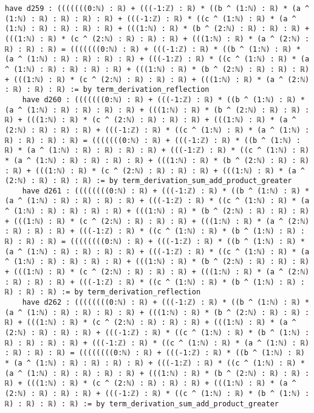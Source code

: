 \documentclass{article}
\begin{document}
\begin{tcolorbox}[colback=white!10, width=\linewidth]
\begin{lstlisting}[language=Lean4]
    have d259 : (((((((0:ℕ) : ℝ) + (((-1:ℤ) : ℝ) * ((b ^ (1:ℕ) : ℝ) * (a ^ (1:ℕ) : ℝ) : ℝ) : ℝ) : ℝ) + (((-1:ℤ) : ℝ) * ((c ^ (1:ℕ) : ℝ) * (a ^ (1:ℕ) : ℝ) : ℝ) : ℝ) : ℝ) + (((1:ℕ) : ℝ) * (b ^ (2:ℕ) : ℝ) : ℝ) : ℝ) + (((1:ℕ) : ℝ) * (c ^ (2:ℕ) : ℝ) : ℝ) : ℝ) + (((1:ℕ) : ℝ) * (a ^ (2:ℕ) : ℝ) : ℝ) : ℝ) = (((((((0:ℕ) : ℝ) + (((-1:ℤ) : ℝ) * ((b ^ (1:ℕ) : ℝ) * (a ^ (1:ℕ) : ℝ) : ℝ) : ℝ) : ℝ) + (((-1:ℤ) : ℝ) * ((c ^ (1:ℕ) : ℝ) * (a ^ (1:ℕ) : ℝ) : ℝ) : ℝ) : ℝ) + (((1:ℕ) : ℝ) * (b ^ (2:ℕ) : ℝ) : ℝ) : ℝ) + (((1:ℕ) : ℝ) * (c ^ (2:ℕ) : ℝ) : ℝ) : ℝ) + (((1:ℕ) : ℝ) * (a ^ (2:ℕ) : ℝ) : ℝ) : ℝ) := by term_derivation_reflection
    have d260 : (((((((0:ℕ) : ℝ) + (((-1:ℤ) : ℝ) * ((b ^ (1:ℕ) : ℝ) * (a ^ (1:ℕ) : ℝ) : ℝ) : ℝ) : ℝ) + (((1:ℕ) : ℝ) * (b ^ (2:ℕ) : ℝ) : ℝ) : ℝ) + (((1:ℕ) : ℝ) * (c ^ (2:ℕ) : ℝ) : ℝ) : ℝ) + (((1:ℕ) : ℝ) * (a ^ (2:ℕ) : ℝ) : ℝ) : ℝ) + (((-1:ℤ) : ℝ) * ((c ^ (1:ℕ) : ℝ) * (a ^ (1:ℕ) : ℝ) : ℝ) : ℝ) : ℝ) = (((((((0:ℕ) : ℝ) + (((-1:ℤ) : ℝ) * ((b ^ (1:ℕ) : ℝ) * (a ^ (1:ℕ) : ℝ) : ℝ) : ℝ) : ℝ) + (((-1:ℤ) : ℝ) * ((c ^ (1:ℕ) : ℝ) * (a ^ (1:ℕ) : ℝ) : ℝ) : ℝ) : ℝ) + (((1:ℕ) : ℝ) * (b ^ (2:ℕ) : ℝ) : ℝ) : ℝ) + (((1:ℕ) : ℝ) * (c ^ (2:ℕ) : ℝ) : ℝ) : ℝ) + (((1:ℕ) : ℝ) * (a ^ (2:ℕ) : ℝ) : ℝ) : ℝ) := by term_derivation_sum_add_product_greater
    have d261 : ((((((((0:ℕ) : ℝ) + (((-1:ℤ) : ℝ) * ((b ^ (1:ℕ) : ℝ) * (a ^ (1:ℕ) : ℝ) : ℝ) : ℝ) : ℝ) + (((-1:ℤ) : ℝ) * ((c ^ (1:ℕ) : ℝ) * (a ^ (1:ℕ) : ℝ) : ℝ) : ℝ) : ℝ) + (((1:ℕ) : ℝ) * (b ^ (2:ℕ) : ℝ) : ℝ) : ℝ) + (((1:ℕ) : ℝ) * (c ^ (2:ℕ) : ℝ) : ℝ) : ℝ) + (((1:ℕ) : ℝ) * (a ^ (2:ℕ) : ℝ) : ℝ) : ℝ) + (((-1:ℤ) : ℝ) * ((c ^ (1:ℕ) : ℝ) * (b ^ (1:ℕ) : ℝ) : ℝ) : ℝ) : ℝ) = ((((((((0:ℕ) : ℝ) + (((-1:ℤ) : ℝ) * ((b ^ (1:ℕ) : ℝ) * (a ^ (1:ℕ) : ℝ) : ℝ) : ℝ) : ℝ) + (((-1:ℤ) : ℝ) * ((c ^ (1:ℕ) : ℝ) * (a ^ (1:ℕ) : ℝ) : ℝ) : ℝ) : ℝ) + (((1:ℕ) : ℝ) * (b ^ (2:ℕ) : ℝ) : ℝ) : ℝ) + (((1:ℕ) : ℝ) * (c ^ (2:ℕ) : ℝ) : ℝ) : ℝ) + (((1:ℕ) : ℝ) * (a ^ (2:ℕ) : ℝ) : ℝ) : ℝ) + (((-1:ℤ) : ℝ) * ((c ^ (1:ℕ) : ℝ) * (b ^ (1:ℕ) : ℝ) : ℝ) : ℝ) : ℝ) := by term_derivation_reflection
    have d262 : ((((((((0:ℕ) : ℝ) + (((-1:ℤ) : ℝ) * ((b ^ (1:ℕ) : ℝ) * (a ^ (1:ℕ) : ℝ) : ℝ) : ℝ) : ℝ) + (((1:ℕ) : ℝ) * (b ^ (2:ℕ) : ℝ) : ℝ) : ℝ) + (((1:ℕ) : ℝ) * (c ^ (2:ℕ) : ℝ) : ℝ) : ℝ) + (((1:ℕ) : ℝ) * (a ^ (2:ℕ) : ℝ) : ℝ) : ℝ) + (((-1:ℤ) : ℝ) * ((c ^ (1:ℕ) : ℝ) * (b ^ (1:ℕ) : ℝ) : ℝ) : ℝ) : ℝ) + (((-1:ℤ) : ℝ) * ((c ^ (1:ℕ) : ℝ) * (a ^ (1:ℕ) : ℝ) : ℝ) : ℝ) : ℝ) = ((((((((0:ℕ) : ℝ) + (((-1:ℤ) : ℝ) * ((b ^ (1:ℕ) : ℝ) * (a ^ (1:ℕ) : ℝ) : ℝ) : ℝ) : ℝ) + (((-1:ℤ) : ℝ) * ((c ^ (1:ℕ) : ℝ) * (a ^ (1:ℕ) : ℝ) : ℝ) : ℝ) : ℝ) + (((1:ℕ) : ℝ) * (b ^ (2:ℕ) : ℝ) : ℝ) : ℝ) + (((1:ℕ) : ℝ) * (c ^ (2:ℕ) : ℝ) : ℝ) : ℝ) + (((1:ℕ) : ℝ) * (a ^ (2:ℕ) : ℝ) : ℝ) : ℝ) + (((-1:ℤ) : ℝ) * ((c ^ (1:ℕ) : ℝ) * (b ^ (1:ℕ) : ℝ) : ℝ) : ℝ) : ℝ) := by term_derivation_sum_add_product_greater

\end{lstlisting}
\end{tcolorbox}
\end{document}
